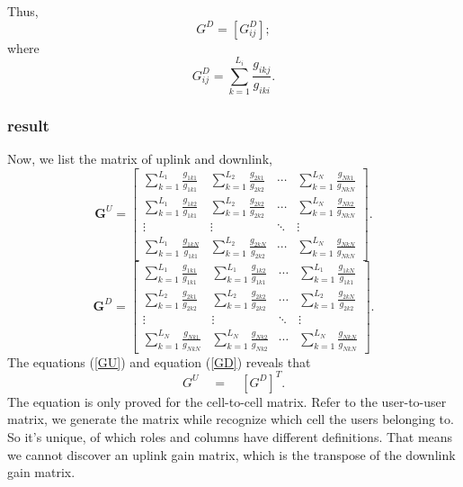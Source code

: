 \documentclass[12pt]{article}
\begin{document}
Thus,  \begin{equation*}
G^D=[G_{ij}^D];
\end{equation*}
where \begin{equation}
G_{ij}^D = \sum^{L_i}_{k=1} \frac{g_{ikj}}{g_{iki}}.
\end{equation}

\subsubsection{result}

Now, we list the matrix of uplink and downlink,
\begin{equation} \label{GU}
\bm G^U = \left[ \begin{matrix}
\sum\limits_{k=1}^{L_1}\frac{g_{1k1}}{g_{1k1}}&\sum\limits_{k=1}^{L_2}\frac{g_{2k1}}{g_{2k2}}&\cdots&\sum\limits_{k=1}^{L_N}\frac{g_{Nk1}}{g_{NkN}}\\
\sum\limits_{k=1}^{L_1}\frac{g_{1k2}}{g_{1k1}}&\sum\limits_{k=1}^{L_2}\frac{g_{2k2}}{g_{2k2}}&\cdots&\sum\limits_{k=1}^{L_N}\frac{g_{Nk2}}{g_{NkN}}\\
\vdots&\vdots&\ddots&\vdots\\
\sum\limits_{k=1}^{L_1}\frac{g_{1kN}}{g_{1k1}}&\sum\limits_{k=1}^{L_2}\frac{g_{2kN}}{g_{2k2}}&\cdots&\sum\limits_{k=1}^{L_N}\frac{g_{NkN}}{g_{NkN}}
\end{matrix}\right]. 
\end{equation}
\begin{equation} \label{GD}
\bm G^D = \left[ \begin{matrix}
\sum\limits_{k=1}^{L_1}\frac{g_{1k1}}{g_{1k1}}&\sum\limits_{k=1}^{L_1}\frac{g_{1k2}}{g_{1k1}}&\cdots&\sum\limits_{k=1}^{L_1}\frac{g_{1kN}}{g_{1k1}}\\
\sum\limits_{k=1}^{L_2}\frac{g_{2k1}}{g_{2k2}}&\sum\limits_{k=1}^{L_2}\frac{g_{2k2}}{g_{2k2}}&\cdots&\sum\limits_{k=1}^{L_2}\frac{g_{2kN}}{g_{2k2}}\\
\vdots&\vdots&\ddots&\vdots\\
\sum\limits_{k=1}^{L_N}\frac{g_{Nk1}}{g_{NkN}}&\sum\limits_{k=1}^{L_N}\frac{g_{Nk2}}{g_{Nk2}}&\cdots&\sum\limits_{k=1}^{L_N}\frac{g_{NkN}}{g_{NkN}}
\end{matrix}\right]. 
\end{equation}
The equations (\ref{GU}) and equation (\ref{GD}) reveals that 
\begin{equation*}
G^U\quad=\quad\left[G^D\right]^T.
\end{equation*}
The equation is only proved for the cell-to-cell matrix. Refer to the user-to-user matrix, we generate the matrix while recognize which cell the users belonging to. So it's unique, of which roles and columns have different definitions. That means we cannot discover an uplink gain matrix, which is the transpose of the downlink gain matrix.
%
%
\end{document}
